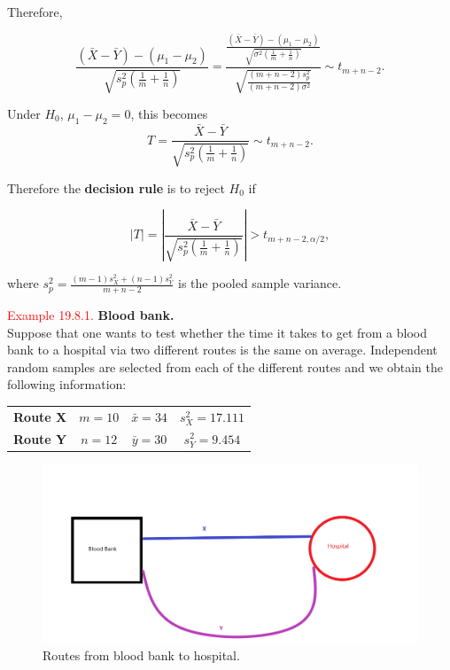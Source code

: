 \documentclass[
]{book}
\begin{document}
Therefore,

\[\frac{ (\bar{X}-\bar{Y}) - (\mu_1-\mu_2) }{ \sqrt{s_p^2 \left( \frac{1}{m} + \frac{1}{n} \right)} }= \frac{ \frac{(\bar{X}-\bar{Y}) - (\mu_1-\mu_2)}{\sqrt{\sigma^2 \left( \frac{1}{m} + \frac{1}{n} \right) }} }{ \sqrt{\frac{(m+n-2)s_p^2}{(m+n-2)\sigma^2}} } \sim t_{m+n-2}.\]

Under \(H_0\), \(\mu_1-\mu_2=0\), this becomes\\

\[T = \frac{\bar{X} - \bar{Y} }{ \sqrt{s_p^2 \left( \frac{1}{m} + \frac{1}{n} \right) }} \sim t_{m+n-2}.\]

Therefore the {\textbf{decision rule}} is to reject \(H_0\) if

\[|T| = \left| \frac{\bar{X} - \bar{Y}}{\sqrt{ s_p^2 \left( \frac{1}{m} + \frac{1}{n} \right) }} \right| > t_{m+n-2,\alpha/2},\]

where \(s_p^2 = \frac{(m-1)s_X^2 + (n-1)s_Y^2}{m+n-2}\) is the pooled sample variance.

\leavevmode{}%
\textcolor{red}{Example 19.8.1.}
{\textbf{Blood bank.}}\\
Suppose that one wants to test whether the time it takes to get from a blood bank to a hospital via two different routes is the same on average. Independent random samples are selected from each of the different routes and we obtain the following information:

\begin{longtable}[]{@{}cccc@{}}
\toprule\noalign{}
\endhead
\bottomrule\noalign{}
\endlastfoot
\textbf{Route X} & \(m=10\) & \(\bar{x}=34\) & \(s_X^2 = 17.111\) \\
\textbf{Route Y} & \(n=12\) & \(\bar{y}=30\) & \(s_Y^2 = 9.454\) \\
\end{longtable}

\begin{figure}
\includegraphics[width=0.8\linewidth]{Images/Blood_bank} \caption{Routes from blood bank to hospital.}\label{fig:blood}
\end{figure}
\end{document}
